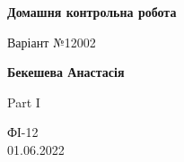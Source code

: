 \documentclass[a4paper,12pt]{article}
\begin{document}
\begin{titlepage}
    \begin{center}
        \vspace*{1cm}
            
        \Huge
        \textbf{Домашня контрольна робота}
            
        \vspace{0.5cm}
        \LARGE
        Варіант №12002
            
        \vspace{1.5cm}
            
        \textbf{Бекешева Анастасія}
            
        \vfill
            
        Part I
            
        \vspace{0.8cm}
            

            
        \Large
        ФІ-12\\01.06.2022
            
    \end{center}
\end{titlepage}
\end{document}
